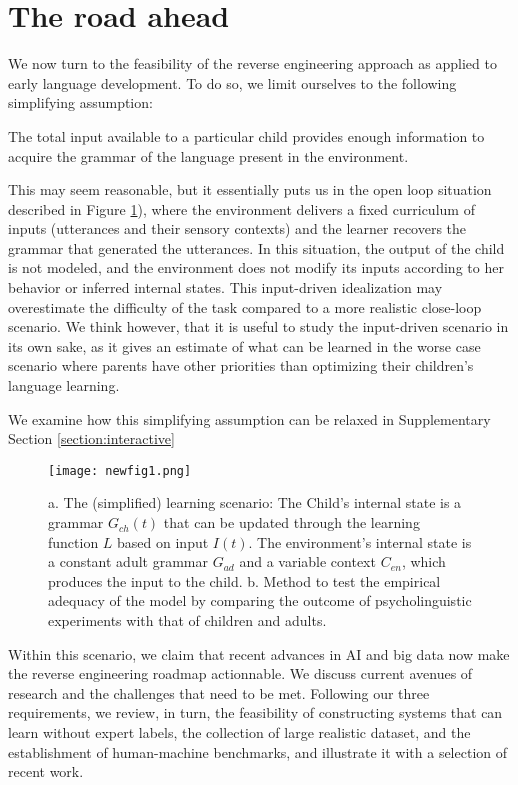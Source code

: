 \documentclass[jou,apacite]{apa6}
\begin{document}
\section{The road ahead}


\label{section:feasibility}


We now turn to the feasibility of the reverse engineering approach as applied to early language development. To do so, we limit ourselves to the following simplifying assumption: 

\begin{displayquote}
The total input available to a particular child provides enough information to acquire the grammar of the language present in the environment. 
\end{displayquote}

This may seem reasonable, but it essentially puts us in the open loop situation described in Figure  \ref{fig:relaf1}),  where the environment delivers a fixed curriculum of inputs (utterances and their sensory contexts) and the learner recovers the grammar that generated the utterances. In this situation, the output of the child is not modeled, and the environment does not modify its inputs according to her behavior or inferred internal states. This input-driven idealization may overestimate the difficulty of the task compared to a more realistic close-loop scenario. We think however, that it is useful to study the input-driven scenario in its own sake, as it gives an estimate of what can be learned in the worse case scenario where parents have other priorities than optimizing their children's language learning.  

We examine how this simplifying assumption can be relaxed in Supplementary Section \ref{section:interactive} 



\begin{figure}
	\centering
	\texttt{[image: newfig1.png]}
	\caption{a. The (simplified) learning scenario: The Child's internal state is a grammar $G_{ch}(t)$ that can be updated through the learning function $L$ based on input $I(t)$. The environment's internal state is a constant adult grammar $G_{ad}$ and a variable context $C_{en}$, which produces the input to the child. b. Method to test the empirical adequacy of the model by comparing the outcome of psycholinguistic experiments with that of children and adults.}
	\label{fig:relaf1}
\end{figure}


Within this scenario, we claim that recent advances in AI and big data now make the reverse engineering roadmap actionnable. We discuss current avenues of research and the challenges that need to be met.  Following our three requirements, we review, in turn, the feasibility of constructing systems that can learn without expert labels, the collection of large realistic dataset, and the establishment of human-machine benchmarks, and illustrate it with a selection of recent work.
\end{document}
